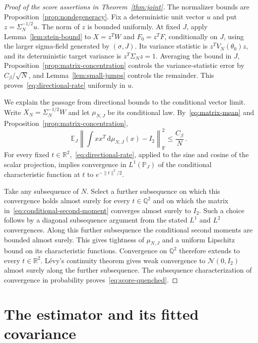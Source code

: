 \documentclass[11pt]{amsart}
\numberwithin{equation}{section}
\theoremstyle{remark}
\newcommand{\E}{\mathbb E}
\newcommand{\Pp}{\mathbb P}
\newcommand{\R}{\mathbb R}
\newcommand{\Frob}{\mathrm{F}}
\newcommand{\Normal}{\mathcal N}
\newcommand{\dd}{\,\mathrm d}
\begin{document}
\begin{proof}[Proof of the score assertions in Theorem~\ref{thm:joint}]
The normalizer bounds are Proposition~\ref{prop:nondegeneracy}. Fix a deterministic unit vector $u$ and put $z=\Sigma_N^{-1/2}u$. The norm of $z$ is bounded uniformly. At fixed $J$, apply Lemma~\ref{lem:stein-bound} to $X=z^TW$ and $F_0=z^TF$, conditionally on $J$, using the larger sigma-field generated by $(\sigma,J)$. Its variance statistic is $z^TV_N(\theta_0)z$, and its deterministic target variance is $z^T\Sigma_Nz=1$. Averaging the bound in $J$, Proposition~\ref{prop:matrix-concentration} controls the variance-statistic error by $C_\beta/\sqrt N$, and Lemma~\ref{lem:small-jumps} controls the remainder. This proves~\eqref{eq:directional-rate} uniformly in $u$.

We explain the passage from directional bounds to the conditional vector limit. Write $X_N=\Sigma_N^{-1/2}W$ and let $\mu_{N,J}$ be its conditional law. By~\eqref{eq:matrix-mean} and Proposition~\ref{prop:matrix-concentration},
\begin{equation}
 \E_J\left\|\int xx^T\dd\mu_{N,J}(x)-I_2\right\|_\Frob^2
 \le\frac{C_\beta}{N}\,.
 \label{eq:conditional-second-moment}
\end{equation}
For every fixed $t\in\R^2$,~\eqref{eq:directional-rate}, applied to the sine and cosine of the scalar projection, implies convergence in $L^1(\Pp_J)$ of the conditional characteristic function at $t$ to $e^{-\|t\|^2/2}$.

Take any subsequence of $N$. Select a further subsequence on which this convergence holds almost surely for every $t\in\mathbb Q^2$ and on which the matrix in~\eqref{eq:conditional-second-moment} converges almost surely to $I_2$. Such a choice follows by a diagonal subsequence argument from the stated $L^1$ and $L^2$ convergences. Along this further subsequence the conditional second moments are bounded almost surely. This gives tightness of $\mu_{N,J}$ and a uniform Lipschitz bound on its characteristic functions. Convergence on $\mathbb Q^2$ therefore extends to every $t\in\R^2$. L\'evy's continuity theorem gives weak convergence to $\Normal(0,I_2)$ almost surely along the further subsequence. The subsequence characterization of convergence in probability proves~\eqref{eq:score-quenched}.
\end{proof}

\section{The estimator and its fitted covariance}\label{sec:estimation}
\end{document}

